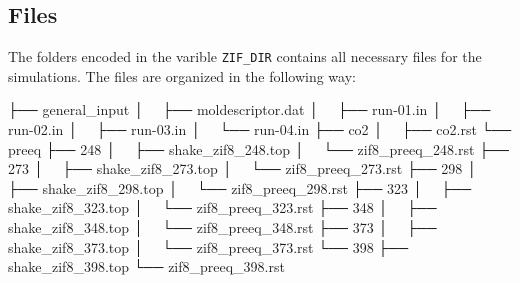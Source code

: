 \documentclass[
  letterpaper,
]{article}
\newenvironment{Shaded}{\begin{snugshade}}{\end{snugshade}}
\newcommand{\ExtensionTok}[1]{\textcolor[rgb]{0.00,0.23,0.31}{#1}}
\newcommand{\NormalTok}[1]{\textcolor[rgb]{0.00,0.23,0.31}{#1}}
\begin{document}
\hypertarget{files}{%
\subsection*{Files}\label{files}}


The folders encoded in the varible \texttt{ZIF\_DIR} contains all
necessary files for the simulations. The files are organized in the
following way:

\begin{tcolorbox}[enhanced jigsaw, opacitybacktitle=0.6, colback=white, rightrule=.15mm, bottomrule=.15mm, coltitle=black, toprule=.15mm, bottomtitle=1mm, arc=.35mm, colframe=quarto-callout-note-color-frame, opacityback=0, toptitle=1mm, breakable, titlerule=0mm, left=2mm, title=\textcolor{quarto-callout-note-color}{\faInfo}\hspace{0.5em}{Note}, leftrule=.75mm, colbacktitle=quarto-callout-note-color!10!white]

\begin{Shaded}
\begin{Highlighting}[]
\ExtensionTok{├──}\NormalTok{ general\_input}
\ExtensionTok{│  }\NormalTok{ ├── moldescriptor.dat}
\ExtensionTok{│  }\NormalTok{ ├── run{-}01.in}
\ExtensionTok{│  }\NormalTok{ ├── run{-}02.in}
\ExtensionTok{│  }\NormalTok{ ├── run{-}03.in}
\ExtensionTok{│  }\NormalTok{ └── run{-}04.in}
\ExtensionTok{├──}\NormalTok{ co2}
\ExtensionTok{│  }\NormalTok{ ├── co2.rst}
\ExtensionTok{└──}\NormalTok{ preeq}
    \ExtensionTok{├──}\NormalTok{ 248}
    \ExtensionTok{│  }\NormalTok{ ├── shake\_zif8\_248.top}
    \ExtensionTok{│  }\NormalTok{ └── zif8\_preeq\_248.rst}
    \ExtensionTok{├──}\NormalTok{ 273}
    \ExtensionTok{│  }\NormalTok{ ├── shake\_zif8\_273.top}
    \ExtensionTok{│  }\NormalTok{ └── zif8\_preeq\_273.rst}
    \ExtensionTok{├──}\NormalTok{ 298}
    \ExtensionTok{│  }\NormalTok{ ├── shake\_zif8\_298.top}
    \ExtensionTok{│  }\NormalTok{ └── zif8\_preeq\_298.rst}
    \ExtensionTok{├──}\NormalTok{ 323}
    \ExtensionTok{│  }\NormalTok{ ├── shake\_zif8\_323.top}
    \ExtensionTok{│  }\NormalTok{ └── zif8\_preeq\_323.rst}
    \ExtensionTok{├──}\NormalTok{ 348}
    \ExtensionTok{│  }\NormalTok{ ├── shake\_zif8\_348.top}
    \ExtensionTok{│  }\NormalTok{ └── zif8\_preeq\_348.rst}
    \ExtensionTok{├──}\NormalTok{ 373}
    \ExtensionTok{│  }\NormalTok{ ├── shake\_zif8\_373.top}
    \ExtensionTok{│  }\NormalTok{ └── zif8\_preeq\_373.rst}
    \ExtensionTok{└──}\NormalTok{ 398}
        \ExtensionTok{├──}\NormalTok{ shake\_zif8\_398.top}
        \ExtensionTok{└──}\NormalTok{ zif8\_preeq\_398.rst}
\end{Highlighting}
\end{Shaded}

\end{tcolorbox}
\end{document}
